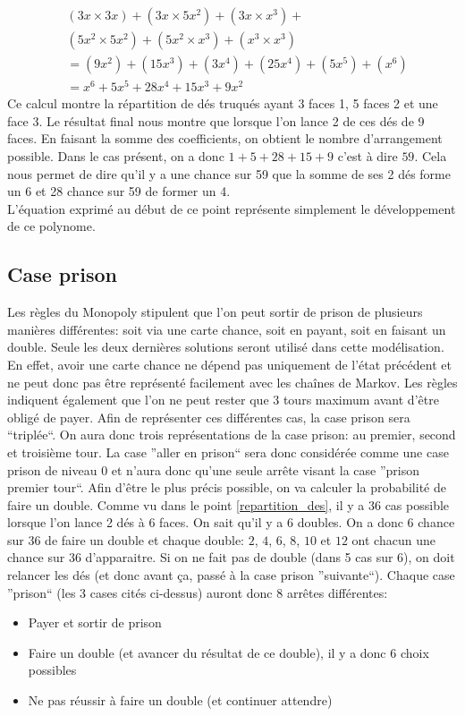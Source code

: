 \documentclass[letterpaper]{article}
\begin{document}
    \begin{align*}
     &(3x \times 3x) + (3x \times 5x^2) + (3x \times x^3) +\\
     &(5x^2 \times 5x^2) + (5x^2 \times x^3) + (x^3 \times x^3)\\
     &= (9x^2) + (15x^3) + (3x^4) + (25x^4) + (5x^5) + (x^6)\\
     &= x^6 + 5x^5 + 28x^4 + 15x^3 + 9x^2
    \end{align*}
    Ce calcul montre la répartition de dés truqués ayant 3 faces 1, 5 faces 2 et une face 3.
    Le résultat final nous montre que lorsque l'on lance 2 de ces dés de 9 faces. En faisant
    la somme des coefficients, on obtient le nombre d'arrangement possible.  Dans le cas
    présent, on a donc $1 + 5 + 28 + 15 + 9$ c'est à dire $59$.  Cela nous permet de dire
    qu'il y a une chance sur 59 que la somme de ses 2 dés forme un 6 et 28 chance sur 59
    de former un 4.\\
    L'équation exprimé au début de ce point représente simplement le développement de 
    ce polynome.
    
    
  \subsection{Case prison}
    Les règles du Monopoly stipulent que l'on peut sortir de prison de plusieurs manières 
    différentes: soit via une carte chance, soit en payant, soit en faisant un double.
    Seule les deux dernières solutions seront utilisé dans cette modélisation.  En effet,
    avoir une carte chance ne dépend pas uniquement de l'état précédent et ne peut donc
    pas être représenté facilement avec les chaînes de Markov. Les règles indiquent 
    également que l'on ne peut rester que 3 tours maximum avant d'être obligé de payer.
    Afin de représenter ces différentes cas, la case prison sera ``triplée``.  On aura
    donc trois représentations de la case prison: au premier, second et troisième tour.
    La case ''aller en prison`` sera donc considérée comme une case prison de niveau 0 et
    n'aura donc qu'une seule arrête visant la case ''prison premier tour``.
    Afin d'être le plus précis possible, on va calculer la probabilité de faire un double.
    Comme vu dans le point \ref{repartition_des}, il y a 36 cas possible lorsque l'on lance 
    2 dés à 6 faces.  On sait qu'il y a 6 doubles.  On a donc 6 chance sur 36 de faire un
    double et chaque double: $2$, $4$, $6$, $8$, $10$ et $12$ ont chacun une chance sur 36
    d'apparaitre.  Si on ne fait pas de double (dans 5 cas sur 6), on doit relancer les 
    dés (et donc avant ça, passé à la case prison ''suivante``).
    Chaque case ''prison`` (les 3 cases cités ci-dessus) auront donc 8 arrêtes différentes:
    \begin{itemize}
     \item Payer et sortir de prison 
     \item Faire un double (et avancer du résultat de ce double), il y a donc 6 choix possibles
     \item Ne pas réussir à faire un double (et continuer attendre)
    \end{itemize}
    
\end{document}
